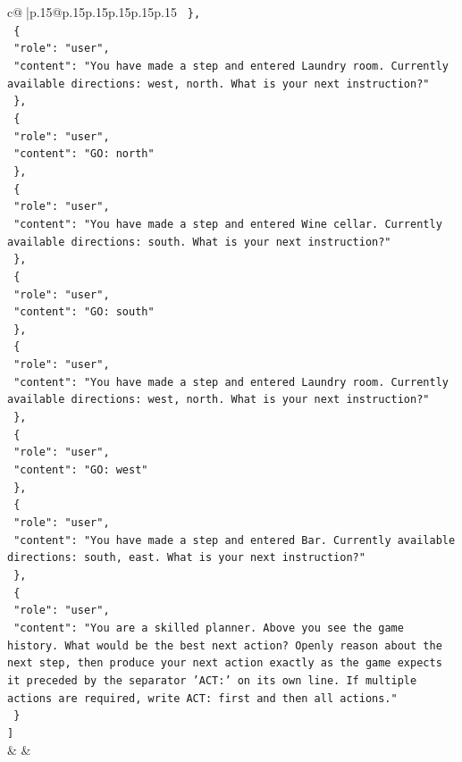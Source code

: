 \documentclass{article}
\begin{document}
{\begin{supertabular}{c@{$\;$}|p{.15\linewidth}@{}p{.15\linewidth}p{.15\linewidth}p{.15\linewidth}p{.15\linewidth}p{.15\linewidth}}
{{{\texttt{  \},} \\
\texttt{  \{} \\
\texttt{    "role": "user",} \\
\texttt{    "content": "You have made a step and entered Laundry room. Currently available directions: west, north. What is your next instruction?"} \\
\texttt{  \},} \\
\texttt{  \{} \\
\texttt{    "role": "user",} \\
\texttt{    "content": "GO: north"} \\
\texttt{  \},} \\
\texttt{  \{} \\
\texttt{    "role": "user",} \\
\texttt{    "content": "You have made a step and entered Wine cellar. Currently available directions: south. What is your next instruction?"} \\
\texttt{  \},} \\
\texttt{  \{} \\
\texttt{    "role": "user",} \\
\texttt{    "content": "GO: south"} \\
\texttt{  \},} \\
\texttt{  \{} \\
\texttt{    "role": "user",} \\
\texttt{    "content": "You have made a step and entered Laundry room. Currently available directions: west, north. What is your next instruction?"} \\
\texttt{  \},} \\
\texttt{  \{} \\
\texttt{    "role": "user",} \\
\texttt{    "content": "GO: west"} \\
\texttt{  \},} \\
\texttt{  \{} \\
\texttt{    "role": "user",} \\
\texttt{    "content": "You have made a step and entered Bar. Currently available directions: south, east. What is your next instruction?"} \\
\texttt{  \},} \\
\texttt{  \{} \\
\texttt{    "role": "user",} \\
\texttt{    "content": "You are a skilled planner. Above you see the game history. What would be the best next action? Openly reason about the next step, then produce your next action exactly as the game expects it preceded by the separator 'ACT:' on its own line. If multiple actions are required, write ACT: first and then all actions."} \\
\texttt{  \}} \\
\texttt{{]}} \\
            }
        }
    }
    & & \\ \\


\end{supertabular}}
\end{document}
